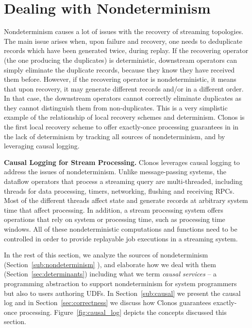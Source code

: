 \documentclass[sigconf]{acmart}
\newcommand{\para}[1]{\vspace{1mm}\noindent\textbf{#1.}}
\begin{document}
\section{Dealing with Nondeterminism}
\label{sec:nondeterminism}

Nondeterminism causes a lot of issues with the recovery of streaming topologies. The main issue arises when, upon failure and recovery, one needs to deduplicate records which have been generated twice, during replay. If the recovering operator (the one producing the duplicates) is deterministic, downstream operators can simply eliminate the duplicate records, because they know they have received them before. However, if the recovering operator is nondeterministic, it means that upon recovery, it may generate different records and/or in a different order. In that case, the downstream operators cannot correctly eliminate duplicates as they cannot distinguish them from non-duplicates. This is a very simplistic example of the relationship of local recovery schemes and determinism.  Clonos is the first local recovery scheme to offer exactly-once processing guarantees in in the lack of determinism by tracking all sources of nondeterminism, and by leveraging causal logging.

\para{Causal Logging for Stream Processing} Clonos leverages causal logging \cite{elnozahy1994manetho} to address the issues of nondeterminism. Unlike message-passing systems, the dataflow operators that process a streaming query are multi-threaded, including threads for data processing, timers, networking, flushing and receiving RPCs. Most of the different threads affect state and generate records at arbitrary system time that affect processing. In addition, a stream processing  system offers operations that rely on system or processing time, such as processing time windows. All of these nondeterministic computations and functions need to be controlled in order to provide replayable job executions in a streaming system.

\vspace{1mm}
In the rest of this section, we analyze the sources of nondeterminism (Section~\ref{sub:nondeterminism}%
), and elaborate how we deal with them (Section~\ref{sec:determinants}) including what we term \textit{causal services} -- a programming abstraction to support nondeterminism for system programmers but also to users authoring UDFs. In Section~\ref{sub:causal} we present the causal log and in Section~\ref{sec:correctness} we discuss how Clonos guarantees  exactly-once processing. Figure~\ref{fig:causal_log} depicts the concepts discussed this section.
\end{document}
